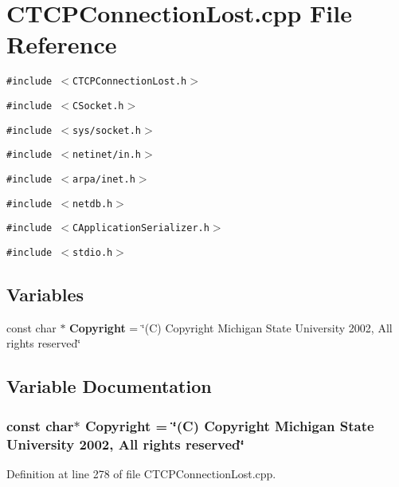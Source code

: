 \section{CTCPConnection\-Lost.cpp File Reference}
\label{CTCPConnectionLost_8cpp}
{\tt \#include $<$CTCPConnection\-Lost.h$>$}\par
{\tt \#include $<$CSocket.h$>$}\par
{\tt \#include $<$sys/socket.h$>$}\par
{\tt \#include $<$netinet/in.h$>$}\par
{\tt \#include $<$arpa/inet.h$>$}\par
{\tt \#include $<$netdb.h$>$}\par
{\tt \#include $<$CApplication\-Serializer.h$>$}\par
{\tt \#include $<$stdio.h$>$}\par
\subsection*{Variables}
\begin{CompactItemize}
\item 
const char $\ast$ {\bf Copyright} = \char`\"{}(C) Copyright Michigan State University 2002, All rights reserved\char`\"{}
\end{CompactItemize}


\subsection{Variable Documentation}
\subsubsection{\setlength{\rightskip}{0pt plus 5cm}const char$\ast$ Copyright = \char`\"{}(C) Copyright Michigan State University 2002, All rights reserved\char`\"{}\hspace{0.3cm}{\tt  [static]}}\label{CTCPConnectionLost_8cpp_a0}




Definition at line 278 of file CTCPConnection\-Lost.cpp.